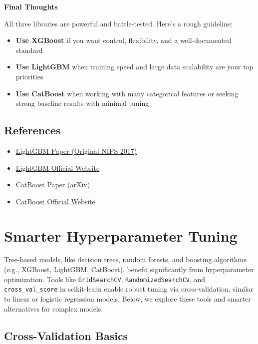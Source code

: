 \documentclass[
  letterpaper,
  DIV=11,
  numbers=noendperiod]{scrreprt}
\providecommand{\tightlist}{%
  \setlength{\itemsep}{0pt}\setlength{\parskip}{0pt}}\usepackage{longtable,booktabs,array}
\begin{document}
\textbf{Final Thoughts}

All three libraries are powerful and battle-tested. Here's a rough
guideline:

\begin{itemize}
\tightlist
\item
  \textbf{Use XGBoost} if you want control, flexibility, and a
  well-documented standard
\item
  \textbf{Use LightGBM} when training speed and large data scalability
  are your top priorities
\item
  \textbf{Use CatBoost} when working with many categorical features or
  seeking strong baseline results with minimal tuning
\end{itemize}

\section{References}\label{references}

\begin{itemize}
\tightlist
\item
  \href{https://papers.nips.cc/paper_files/paper/2017/file/6449f44a102fde848669bdd9eb6b76fa-Paper.pdf}{LightGBM
  Paper (Original NIPS 2017)}
\item
  \href{https://lightgbm.readthedocs.io/}{LightGBM Official Website}
\item
  \href{https://arxiv.org/abs/1810.11363}{CatBoost Paper (arXiv)}
\item
  \href{https://catboost.ai/}{CatBoost Official Website}
\end{itemize}

\chapter{Smarter Hyperparameter
Tuning}\label{smarter-hyperparameter-tuning}

Tree-based models, like decision trees, random forests, and boosting
algorithms (e.g., XGBoost, LightGBM, CatBoost), benefit significantly
from hyperparameter optimization. Tools like \texttt{GridSearchCV},
\texttt{RandomizedSearchCV}, and \texttt{cross\_val\_score} in
scikit-learn enable robust tuning via cross-validation, similar to
linear or logistic regression models. Below, we explore these tools and
smarter alternatives for complex models.

\section{Cross-Validation Basics}\label{cross-validation-basics}
\end{document}
